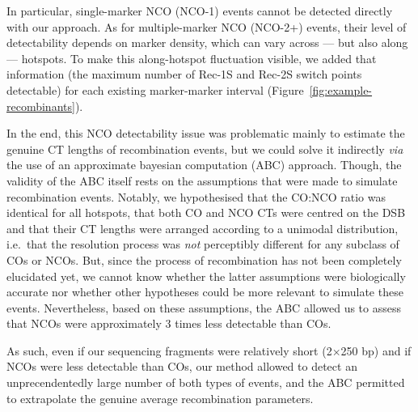 In particular, single-marker NCO (NCO-1) events cannot be detected directly with our approach.
As for multiple-marker NCO (NCO-2+) events, their level of detectability depends on marker density, which can vary across — but also along — hotspots.
To make this along-hotspot fluctuation visible, we added that information (the maximum number of Rec-1S and Rec-2S switch points detectable) for each existing marker-marker interval (Figure~\ref{fig:example-recombinants}).

In the end, this NCO detectability issue was problematic mainly to estimate the genuine CT lengths of recombination events, but we could solve it indirectly \textit{via} the use of an approximate bayesian computation (ABC) approach.
Though, the validity of the ABC itself rests on the assumptions that were made to simulate recombination events. 
Notably, we hypothesised that the CO:NCO ratio was identical for all hotspots, that both CO and NCO CTs were centred on the DSB and that their CT lengths were arranged according to a unimodal distribution, i.e.\ that the resolution process was \textit{not} perceptibly different for any subclass of COs or NCOs.
But, since the process of recombination has not been completely elucidated yet, we cannot know whether the latter assumptions were biologically accurate nor whether other hypotheses could be more relevant to simulate these events.
Nevertheless, based on these assumptions, the ABC allowed us to assess that NCOs were approximately 3 times less detectable than COs.

As such, even if our sequencing fragments were relatively short (2$\times$250 bp) and if NCOs were less detectable than COs, our method allowed to detect an unprecendentedly large number of both types of events, and the ABC permitted to extrapolate the genuine average recombination parameters.\\





